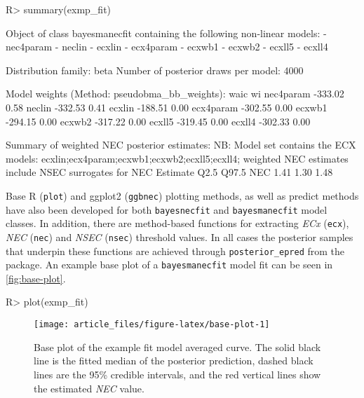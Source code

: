 \documentclass[
]{jss}
\begin{document}
\begin{CodeChunk}
\begin{CodeInput}
R> summary(exmp_fit)
\end{CodeInput}
\begin{CodeOutput}
Object of class bayesmanecfit containing the following non-linear models:
  -  nec4param
  -  neclin
  -  ecxlin
  -  ecx4param
  -  ecxwb1
  -  ecxwb2
  -  ecxll5
  -  ecxll4

Distribution family: beta
Number of posterior draws per model:  4000

Model weights (Method: pseudobma_bb_weights):
             waic   wi
nec4param -333.02 0.58
neclin    -332.53 0.41
ecxlin    -188.51 0.00
ecx4param -302.55 0.00
ecxwb1    -294.15 0.00
ecxwb2    -317.22 0.00
ecxll5    -319.45 0.00
ecxll4    -302.33 0.00


Summary of weighted NEC posterior estimates:
NB: Model set contains the ECX models: ecxlin;ecx4param;ecxwb1;ecxwb2;ecxll5;ecxll4; weighted NEC estimates include NSEC surrogates for NEC
    Estimate Q2.5 Q97.5
NEC     1.41 1.30  1.48
\end{CodeOutput}
\end{CodeChunk}

Base R (\texttt{plot}) and ggplot2 (\texttt{ggbnec}) plotting methods,
as well as predict methods have also been developed for both
\texttt{bayesnecfit} and \texttt{bayesmanecfit} model classes. In
addition, there are method-based functions for extracting \emph{ECx}
(\texttt{ecx}), \emph{NEC} (\texttt{nec}) and \emph{NSEC}
(\texttt{nsec}) threshold values. In all cases the posterior samples
that underpin these functions are achieved through
\texttt{posterior\_epred} from the  package. An example base
plot of a \texttt{bayesmanecfit} model fit can be seen in
\autoref{fig:base-plot}.

\begin{CodeChunk}
\begin{CodeInput}
R> plot(exmp_fit)
\end{CodeInput}
\begin{figure}

{\centering \texttt{[image: article\_files/figure-latex/base-plot-1]} 

}

\caption[Base plot of the example fit model averaged curve]{Base plot of the example fit model averaged curve. The solid black line is the fitted median of the posterior prediction, dashed black lines are the 95\% credible intervals, and the red vertical lines show the estimated \textit{NEC} value.}\label{fig:base-plot}
\end{figure}
\end{CodeChunk}
\end{document}
